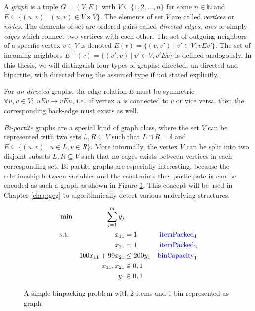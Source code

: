 		A \textit{graph} is a tuple $G = (V, E)$ with $V \subseteq \{ 1, 2, \ldots, n \}$ for some $n \in \mathbb{N}$ and $E \subseteq \{ (u, v) \mid (u, v) \in V \times V \}$. The elements of set $V$ are called \textit{vertices} or \textit{nodes}.
		The elements of set are ordered pairs called \textit{directed edges}, \textit{arcs} or simply \textit{edges} which connect two vertices with each other.
		The set of outgoing neighbors of a specific vertex $v \in V$ is denoted $E(v) = \{ (v, v') \; | \; v' \in V, vEv' \}$. 
		The set of incoming neighbors $E^{-1}(v) = \{ (v', v) \; | \; v' \in V, v'Ev \}$ is defined analogously.
		In this thesis, we will distinguish four types of graphs: directed, un-directed and bipartite, with directed being the assumed type if not stated explicitly.
		
		For \textit{un-directed} graphs, the edge relation $E$ must be symmetric $\forall u,v \in V: \; uEv \xrightarrow{} vEu$, i.e., if vertex $u$ is connected to $v$ or vice versa, then the corresponding back-edge must exists as well.
		
		\textit{Bi-partite} graphs are a special kind of graph class, where the set $V$ can be represented with two sets $L, R \subseteq V$ such that $L \cap R = \emptyset$ and $E \subseteq \{ (u, v) \mid u \in L, v \in R \}$.
		More informally, the vertex $V$ can be split into two disjoint subsets $L, R \subseteq V$ such that no edges exists between vertices in each corresponding set.
		Bi-partite graphs are especially interesting, because the relationship between variables and the constraints they participate in can be encoded as such a graph as shown in Figure \ref{fig:prelims:graphs:binpackbipartite}. This concept will be used in Chapter \ref{chap:gcg} to algorithmically detect various underlying structures. 
		\begin{figure}[ht!]
			\centering
			\begin{minipage}{0.47\textwidth}
				
			\end{minipage}
			\begin{minipage}{0.47\textwidth}
				\begin{align}
					&\min &\sum_{j=1}^m y_j \nonumber \\
					&\text{s.t.} &x_{11} &= 1 & \text{\textcolor{blue}{itemPacked}}_1 \nonumber \\
					&& x_{21} &= 1 & \text{\textcolor{blue}{itemPacked}}_2\nonumber \\
					&& 100 x_{11} + 99 x_{21} &\leq 200 y_1 & \text{\textcolor{blue}{binCapacity}}_1\nonumber \\
					&& x_{11}, x_{21} &\in { 0, 1 }  \nonumber \\
					&& y_1 &\in { 0, 1 } \nonumber
				\end{align}
			\end{minipage}
			\caption{A simple binpacking problem with $2$ items and $1$ bin represented as  graph.}
			\label{fig:prelims:graphs:binpackbipartite}
		\end{figure}
	
